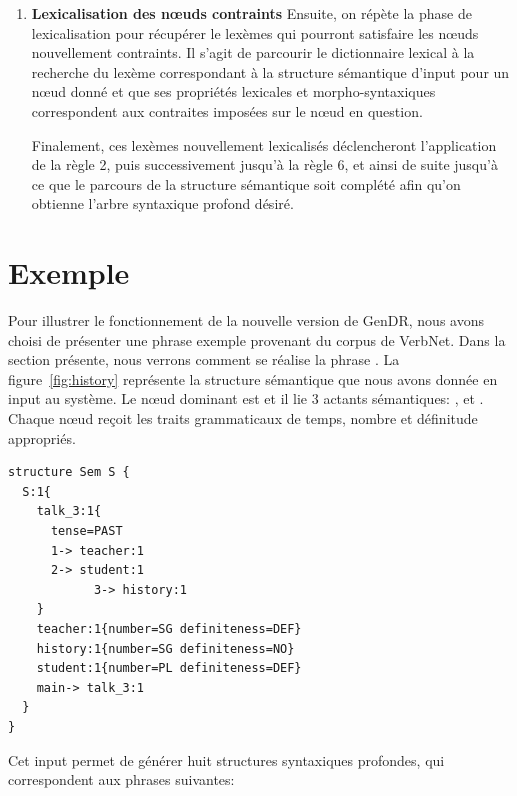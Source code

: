 \begin{enumerate}
	\item \textbf{Lexicalisation des n\oe{}uds contraints}
Ensuite, on répète la phase de lexicalisation pour récupérer le lexèmes qui pourront satisfaire les n\oe{}uds nouvellement contraints. Il s'agit de parcourir le dictionnaire lexical à la recherche du lexème correspondant à la structure sémantique d'input pour un n\oe{}ud donné et que ses propriétés lexicales et morpho-syntaxiques correspondent aux contraites imposées sur le n\oe{}ud en question.

Finalement, ces lexèmes nouvellement lexicalisés déclencheront l'application de la règle 2, puis successivement jusqu'à la règle 6, et ainsi de suite jusqu'à ce que le parcours de la structure sémantique soit complété afin qu'on obtienne l'arbre syntaxique profond désiré.

\end{enumerate} 

\section{Exemple}

Pour illustrer le fonctionnement de la nouvelle version de GenDR, nous avons choisi de présenter une phrase exemple provenant du corpus de VerbNet. Dans la section présente, nous verrons comment se réalise la phrase . La figure~\ref{fig:history} représente la structure sémantique que nous avons donnée en input au système. Le n\oe{}ud dominant est  et il lie 3 actants sémantiques: ,  et . Chaque n\oe{}ud reçoit les traits grammaticaux de temps, nombre et définitude appropriés.

\begin{lstlisting}[language=mate, caption=Structure sémantique de \form{The teacher talked about history to the students}, label=fig:history]
structure Sem S {
  S:1{
    talk_3:1{
      tense=PAST 
      1-> teacher:1
      2-> student:1
			3-> history:1
    }
    teacher:1{number=SG definiteness=DEF}
    history:1{number=SG definiteness=NO}
    student:1{number=PL definiteness=DEF}
    main-> talk_3:1
  }
}
\end{lstlisting}

Cet input permet de générer huit structures syntaxiques profondes, qui correspondent aux phrases suivantes:

